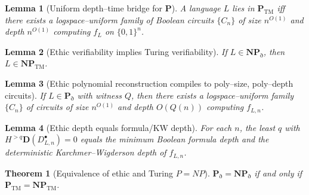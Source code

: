 \documentclass[10pt,a4paper]{amsart}
\newtheorem{lemma}{Lemma}
\newtheorem{theorem}{Theorem}
\begin{document}
\begin{lemma}[Uniform depth–time bridge for \(\mathbf P\)]\label{lem:PTM-circuits}
A language \(L\) lies in \(\mathbf P_{\mathrm{TM}}\) iff there exists a logspace–uniform family of Boolean circuits \(\{C_n\}\) of size \(n^{O(1)}\) and depth \(n^{O(1)}\) computing \(f_{L}\) on \(\{0,1\}^{n}\).
\end{lemma}

\begin{lemma}[Ethic verifiability implies Turing verifiability]\label{lem:EthNP-to-NPTM}
If \(L\in \mathbf{NP}_{\eth}\), then \(L\in \mathbf{NP}_{\mathrm{TM}}\).
\end{lemma}

\begin{lemma}[Ethic polynomial reconstruction compiles to poly–size, poly–depth circuits]\label{lem:EthP-to-circuits}
If \(L\in \mathbf P_{\eth}\) with witness \(Q\), then there exists a logspace–uniform family \(\{C_n\}\) of circuits of size \(n^{O(1)}\) and depth \(O(Q(n))\) computing \(f_{L,n}\).
\end{lemma}

\begin{lemma}[Ethic depth equals formula/KW depth]\label{lem:KW}
For each \(n\), the least \(q\) with \(H^{>q}\mathbf D(D_{L,n}^{\bullet})=0\) equals the minimum Boolean formula depth and the deterministic Karchmer–Wigderson depth of \(f_{L,n}\).
\end{lemma}

\begin{theorem}[Equivalence of ethic and Turing \(P{=}NP\)]
\(\mathbf P_{\eth}=\mathbf{NP}_{\eth}\) if and only if \(\mathbf P_{\mathrm{TM}}=\mathbf{NP}_{\mathrm{TM}}\).
\end{theorem}
\end{document}
